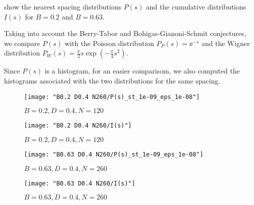 \documentclass[../thesis.tex]{subfiles}
\begin{document}
show the nearest spacing distributions \(P(s)\) and the cumulative
distributions \(I(s)\) for \(B=0.2\) and \(B=0.63\).

Taking into account the Berry-Tabor and Bohigas-Gianoni-Schmit conjectures,
we compare \(P(s)\) with the Poisson distribution \(P_P(s) = \ee^{-s}\)
and the Wigner distribution \(P_W(s) = \frac{\pi}{2} s \exp(-\frac{\pi}{4}s^2)\).

Since \(P(s)\) is a histogram, for an easier comparisom, we also computed the
histograms associated with the two distributions for the same spacing.

\begin{figure}[h]
  \texttt{[image: "B0.2 D0.4 N260/P(s)\_st\_1e-09\_eps\_1e-08"]}  %
  \caption{\(B=0.2, D=0.4, N=120\)}
\label{fig:P(s)-b0.2n120}
\end{figure}

\begin{figure}
  \texttt{[image: "B0.2 D0.4 N260/I(s)"]}  %
  \caption{\(B=0.2, D=0.4, N=120\)}
\label{fig:I(s)-b0.2n120}
\end{figure}

\begin{figure}
  \texttt{[image: "B0.63 D0.4 N260/P(s)\_st\_1e-09\_eps\_1e-08"]}  %
  \caption{\(B=0.63, D=0.4, N=260\)}
\label{fig:P(s)-b0.63n260}
\end{figure}

\begin{figure}
  \texttt{[image: "B0.63 D0.4 N260/I(s)"]}  %
  \caption{\(B=0.63, D=0.4, N=260\)}
\label{fig:I(s)-b0.63n260}
\end{figure}
\end{document}
